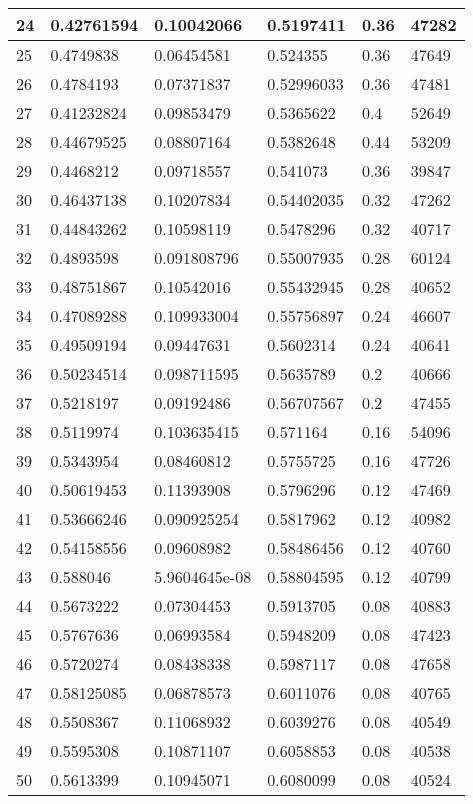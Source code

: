 \begin{longtable}{|l|l|l|l|l|l|}
24 & 0.42761594 & 0.10042066 & 0.5197411 & 0.36 & 47282 \\ \hline 
25 & 0.4749838 & 0.06454581 & 0.524355 & 0.36 & 47649 \\ \hline 
26 & 0.4784193 & 0.07371837 & 0.52996033 & 0.36 & 47481 \\ \hline 
27 & 0.41232824 & 0.09853479 & 0.5365622 & 0.4 & 52649 \\ \hline 
28 & 0.44679525 & 0.08807164 & 0.5382648 & 0.44 & 53209 \\ \hline 
29 & 0.4468212 & 0.09718557 & 0.541073 & 0.36 & 39847 \\ \hline 
30 & 0.46437138 & 0.10207834 & 0.54402035 & 0.32 & 47262 \\ \hline 
31 & 0.44843262 & 0.10598119 & 0.5478296 & 0.32 & 40717 \\ \hline 
32 & 0.4893598 & 0.091808796 & 0.55007935 & 0.28 & 60124 \\ \hline 
33 & 0.48751867 & 0.10542016 & 0.55432945 & 0.28 & 40652 \\ \hline 
34 & 0.47089288 & 0.109933004 & 0.55756897 & 0.24 & 46607 \\ \hline 
35 & 0.49509194 & 0.09447631 & 0.5602314 & 0.24 & 40641 \\ \hline 
36 & 0.50234514 & 0.098711595 & 0.5635789 & 0.2 & 40666 \\ \hline 
37 & 0.5218197 & 0.09192486 & 0.56707567 & 0.2 & 47455 \\ \hline 
38 & 0.5119974 & 0.103635415 & 0.571164 & 0.16 & 54096 \\ \hline 
39 & 0.5343954 & 0.08460812 & 0.5755725 & 0.16 & 47726 \\ \hline 
40 & 0.50619453 & 0.11393908 & 0.5796296 & 0.12 & 47469 \\ \hline 
41 & 0.53666246 & 0.090925254 & 0.5817962 & 0.12 & 40982 \\ \hline 
42 & 0.54158556 & 0.09608982 & 0.58486456 & 0.12 & 40760 \\ \hline 
43 & 0.588046 & 5.9604645e-08 & 0.58804595 & 0.12 & 40799 \\ \hline 
44 & 0.5673222 & 0.07304453 & 0.5913705 & 0.08 & 40883 \\ \hline 
45 & 0.5767636 & 0.06993584 & 0.5948209 & 0.08 & 47423 \\ \hline 
46 & 0.5720274 & 0.08438338 & 0.5987117 & 0.08 & 47658 \\ \hline 
47 & 0.58125085 & 0.06878573 & 0.6011076 & 0.08 & 40765 \\ \hline 
48 & 0.5508367 & 0.11068932 & 0.6039276 & 0.08 & 40549 \\ \hline 
49 & 0.5595308 & 0.10871107 & 0.6058853 & 0.08 & 40538 \\ \hline 
50 & 0.5613399 & 0.10945071 & 0.6080099 & 0.08 & 40524 \\ \hline 
\end{longtable}